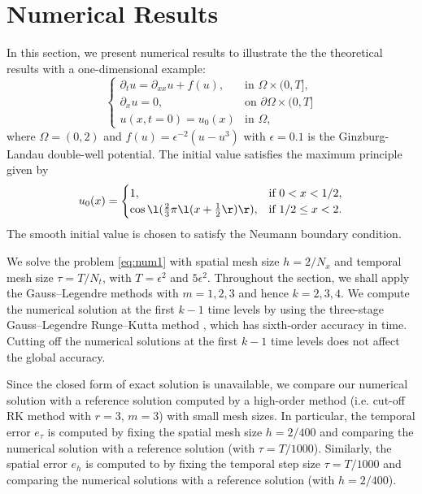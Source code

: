 \section{Numerical Results}
In this section, we present numerical results to illustrate the the theoretical results
with a one-dimensional example:
\begin{equation}\label{eq:num1}
\begin{cases}
  \partial_t u = \partial_{xx}u + f(u), & \mbox{in } \Omega \times(0,T], \\
  \partial_x u = 0, & \mbox{on } \partial\Omega \times(0,T] \\
  u(x,t=0) = u_0(x) & \mbox{in } \Omega,
\end{cases}
\end{equation}
where  $\Omega = (0,2)$ and $f(u) = \epsilon^{-2}(u-u^3)$ with $\epsilon=0.1$ is
the Ginzburg-Landau double-well potential.
The initial value satisfies the maximum principle given by
\begin{equation}\label{eq:num1_init}
u_0(x) = \begin{cases}
           1, & \mbox{if } 0<x<1/2, \\
           \cos\l(\frac23\pi\l(x+\frac12\r)\r), & \mbox{if }  1/2\leq x<2.
         \end{cases}
\end{equation}
The smooth initial value is chosen to satisfy the Neumann boundary condition.

We solve the problem \eqref{eq:num1} with spatial mesh size $h = 2/N_x$
and temporal mesh size $\tau = T / N_t$, with $T=\epsilon^2$ and $5\epsilon^2$.
Throughout the section, we shall apply the Gauss--Legendre methods with $m=1,2,3$ and hence $k=2,3,4$.
We compute the numerical solution at the first $k -1$ time levels by using the three-stage
Gauss--Legendre Runge--Kutta method \cite[Table 5.2]{HairerWanner:2010}, which has sixth-order accuracy in time.
Cutting off the numerical solutions at the first $k - 1$ time levels does not affect the global accuracy.



Since the closed form of exact solution is
unavailable, we compare our numerical solution with a reference solution computed by a
high-order method (i.e. cut-off RK method with $r=3$, $m=3$) with small mesh sizes.
In particular, the temporal error $e_\tau$
is computed by fixing the spatial mesh size $h = 2/400$
and comparing the numerical solution with
a reference solution (with $\tau = T/1000$).
Similarly, the spatial error $e_h$
is computed to by fixing the temporal step size
$\tau = T/1000$ and comparing the numerical solutions with
a reference solution (with  $h = 2/400$).

